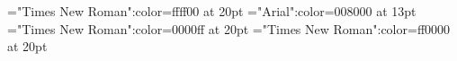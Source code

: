 \documentclass[a4paper]{article}
\begin{document}
 
\thispagestyle{empty} 
\font\tdta="Times New Roman":color=ffff00 at 20pt
\font\tctbta="Arial":color=008000 at 13pt
\font\tbta="Times New Roman":color=0000ff at 20pt
\font\ta="Times New Roman":color=ff0000 at 20pt






\end{document}
